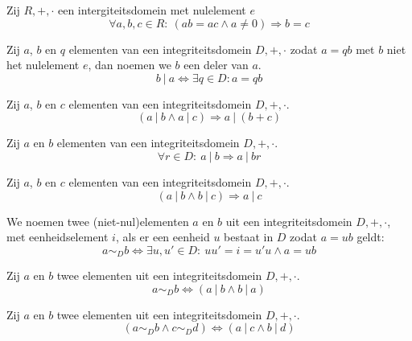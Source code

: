 \documentclass[main.tex]{subfiles}
\begin{document}
\begin{ei}
  Zij $R,+,\cdot$ een intergiteitsdomein met nulelement $e$
  \[ \forall a,b,c \in R:\ (ab = ac \wedge a \neq 0) \Rightarrow b = c \]
\end{ei}

\begin{de}
  Zij $a$, $b$ en $q$ elementen van een integriteitsdomein $D,+,\cdot$ zodat $a= qb$ met $b$ niet het nulelement $e$, dan noemen we $b$ een deler van $a$.
  \[ b\ |\ a \Leftrightarrow \exists q \in D: a = qb \]
\end{de}

\begin{st}
  Zij $a$, $b$ en $c$ elementen van een integriteitsdomein $D,+,\cdot$.
  \[ (a\ |\ b \wedge a\ |\ c) \Rightarrow a\ |\ (b+c) \]
\end{st}

\begin{st}
  Zij $a$ en $b$ elementen van een integriteitsdomein $D,+,\cdot$.
  \[ \forall r \in D:\ a\ |\ b \Rightarrow a\ |\ br  \]
\end{st}

\begin{st}
  Zij $a$, $b$ en $c$ elementen van een integriteitsdomein $D,+,\cdot$.
  \[ (a\ |\ b \wedge b\ |\ c) \Rightarrow a\ |\ c \]
\end{st}

\begin{de}
  We noemen twee (niet-nul)elementen $a$ en $b$ uit een integriteitsdomein $D,+,\cdot$, met eenheidselement $i$,  als er een eenheid $u$ bestaat in $D$ zodat $a=ub$ geldt:
  \[ a \sim_{D} b \Leftrightarrow \exists u,u'\in D:\ uu'= i = u'u \wedge a = ub \]
\end{de}

\begin{st}
  Zij $a$ en $b$ twee elementen uit een integriteitsdomein $D,+,\cdot$.
  \[ a \sim_{D} b \Leftrightarrow (a\ |\ b \wedge b\ |\ a) \]
\end{st}

\begin{st}
  Zij $a$ en $b$ twee elementen uit een integriteitsdomein $D,+,\cdot$.
  \[ (a \sim_{D} b \wedge c \sim_{D} d) \Leftrightarrow (a\ |\ c \wedge b\ |\ d) \]
\end{st}
\end{document}
